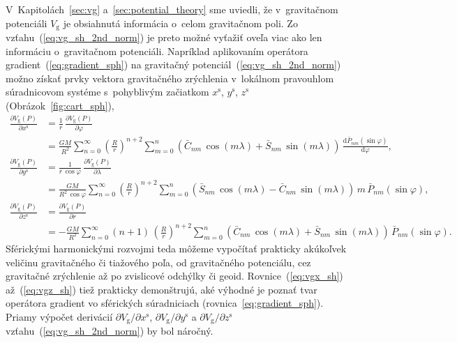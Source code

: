 \documentclass[a4paper,12pt]{book}
\newcommand{\diff}{\mathrm d}
\newcommand{\gidx}{\mathrm g}
\begin{document}
V~Kapitolách~\ref{sec:vg} a~\ref{sec:potential_theory} sme uviedli, že
v~gravitačnom potenciáli $V_\gidx$ je obsiahnutá informácia o~celom gravitačnom
poli.  Zo vzťahu~(\ref{eq:vg_sh_2nd_norm}) je preto možné vyťažiť oveľa viac
ako len informáciu o~gravitačnom potenciáli.  Napríklad aplikovaním operátora 
gradient~(\ref{eq:gradient_sph}) na gravitačný 
potenciál~(\ref{eq:vg_sh_2nd_norm}) možno získať prvky vektora gravitačného 
zrýchlenia v~lokálnom pravouhlom súradnicovom systéme s~pohyblivým začiatkom 
$x^\mathrm{s}$, $y^\mathrm{s}$, $z^\mathrm{s}$ (Obrázok~\ref{fig:cart_sph}),
%
\begin{align}
\label{eq:vgx_sh}
\frac{\partial V_\gidx(P)}{\partial x^\mathrm{s}} &= \frac{1}{r} \, 
\frac{\partial V_\gidx(P)}{\partial \varphi}\nonumber\\
%
&= \frac{GM}{R^2} \sum_{n = 0}^\infty \left( \frac{R}{r} \right)^{n + 2} 
\sum_{m = 0}^{n} \left(
\bar{C}_{nm} \, \cos(m\lambda) + \bar{S}_{nm} \, \sin(m\lambda)\right) \,
\frac{\diff \bar{P}_{nm}(\sin\varphi)}{\diff \varphi}{,}\\
%
\label{eq:vgy_sh}
\frac{\partial V_\gidx(P)}{\partial y^\mathrm{s}} &= \frac{1}{r \, \cos\varphi} 
\, \frac{\partial V_\gidx(P)}{\partial \lambda}\nonumber\\
%
&= \frac{GM}{R^2 \, \cos\varphi} \sum_{n = 0}^\infty \left( \frac{R}{r} 
\right)^{n + 2} \sum_{m = 0}^{n}\left(
\bar{S}_{nm} \, \cos(m\lambda) - \bar{C}_{nm} \, \sin(m\lambda)\right) \, m \,
\bar{P}_{nm}(\sin\varphi){,}\\
%
\label{eq:vgz_sh}
\frac{\partial V_\gidx(P)}{\partial z^\mathrm{s}} &= \frac{\partial 
V_\gidx(P)}{\partial r}\nonumber\\
%
&= - \frac{GM}{R^2} \sum_{n = 0}^\infty (n + 1) \, \left( \frac{R}{r} 
\right)^{n + 2} \sum_{m = 0}^{n}
\left( \bar{C}_{nm} \, \cos(m\lambda) + \bar{S}_{nm} \, \sin(m\lambda)\right)
\, \bar{P}_{nm}(\sin\varphi){.}
\end{align}
%
Sférickými harmonickými rozvojmi teda môžeme vypočítať prakticky akúkoľvek 
veličinu gravitačného či tiažového poľa, od gravitačného potenciálu, cez 
gravitačné zrýchlenie až po zvislicové odchýlky či geoid.  
Rovnice~(\ref{eq:vgx_sh}) až~(\ref{eq:vgz_sh}) tiež prakticky demonštrujú, aké 
výhodné je poznať tvar operátora gradient vo sférických súradniciach 
(rovnica~\ref{eq:gradient_sph}).  Priamy výpočet derivácií $\partial V_\gidx 
\slash \partial x^\mathrm{s}$, $\partial V_\gidx \slash \partial y^\mathrm{s}$ 
a $\partial V_\gidx \slash \partial z^\mathrm{s}$ 
vzťahu~(\ref{eq:vg_sh_2nd_norm}) by bol náročný.
\end{document}

